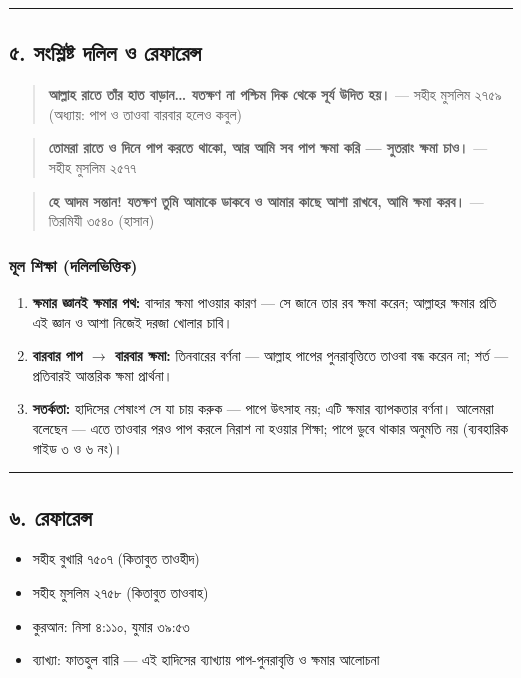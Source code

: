 \medskip\hrule\medskip

\subsection*{৫. সংশ্লিষ্ট দলিল ও রেফারেন্স}

\begin{quote}
\textbf{আল্লাহ রাতে তাঁর হাত বাড়ান… যতক্ষণ না পশ্চিম দিক থেকে সূর্য উদিত হয়।} — সহীহ মুসলিম ২৭৫৯ (অধ্যায়: পাপ ও তাওবা বারবার হলেও কবুল)
\end{quote}

\begin{quote}
\textbf{তোমরা রাতে ও দিনে পাপ করতে থাকো, আর আমি সব পাপ ক্ষমা করি — সুতরাং ক্ষমা চাও।} — সহীহ মুসলিম ২৫৭৭
\end{quote}

\begin{quote}
\textbf{হে আদম সন্তান! যতক্ষণ তুমি আমাকে ডাকবে ও আমার কাছে আশা রাখবে, আমি ক্ষমা করব।} — তিরমিযী ৩৫৪০ (হাসান)
\end{quote}

\subsubsection*{মূল শিক্ষা (দলিলভিত্তিক)}

\begin{enumerate}
\item \textbf{ক্ষমার জ্ঞানই ক্ষমার পথ:} বান্দার ক্ষমা পাওয়ার কারণ — সে জানে তার রব ক্ষমা করেন; আল্লাহর ক্ষমার প্রতি এই জ্ঞান ও আশা নিজেই দরজা খোলার চাবি।
\item \textbf{বারবার পাপ $\rightarrow$ বারবার ক্ষমা:} তিনবারের বর্ণনা — আল্লাহ পাপের পুনরাবৃত্তিতে তাওবা বন্ধ করেন না; শর্ত — প্রতিবারই আন্তরিক ক্ষমা প্রার্থনা।
\item \textbf{সতর্কতা:} হাদিসের শেষাংশ সে যা চায় করুক — পাপে উৎসাহ নয়; এটি ক্ষমার ব্যাপকতার বর্ণনা। আলেমরা বলেছেন — এতে তাওবার পরও পাপ করলে নিরাশ না হওয়ার শিক্ষা; পাপে ডুবে থাকার অনুমতি নয় (ব্যবহারিক গাইড ৩ ও ৬ নং)।
\end{enumerate}
\medskip\hrule\medskip

\subsection*{৬. রেফারেন্স}

\begin{itemize}
\item সহীহ বুখারি ৭৫০৭ (কিতাবুত তাওহীদ)
\item সহীহ মুসলিম ২৭৫৮ (কিতাবুত তাওবাহ)
\item কুরআন: নিসা ৪:১১০, যুমার ৩৯:৫৩
\item ব্যাখ্যা: ফাতহুল বারি — এই হাদিসের ব্যাখ্যায় পাপ-পুনরাবৃত্তি ও ক্ষমার আলোচনা
\end{itemize}


